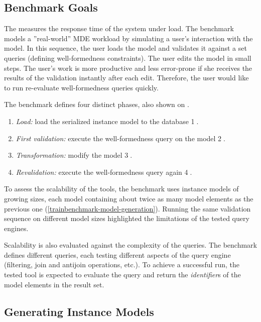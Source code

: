 \subsection{Benchmark Goals}

The \tb{} measures the response time of the system under load. The benchmark models a ''real-world'' MDE workload by simulating a user's interaction with the model. In this sequence, the user loads the model and validates it against a set  queries (defining well-formedness constraints). The user edits the model in small steps. The user's work is more productive and less error-prone if she receives the results of the validation instantly after each edit. Therefore, the user would like to run re-evaluate well-formedness queries quickly.


The benchmark defines four distinct phases, also shown on .

\begin{enumerate}
  \item \emph{Load:} load the serialized instance model to the database \textcircled{1}.
  \item \emph{First validation:} execute the well-formedness query on the model \textcircled{2}.
  \item \emph{Transformation:} modify the model \textcircled{3}.
  \item \emph{Revalidation:} execute the well-formedness query again \textcircled{4}.
\end{enumerate}

To assess the scalability of the tools, the benchmark uses instance models of growing sizes, each model containing about twice as many model elements as the previous one (\autoref{trainbenchmark-model-generation}). Running the same validation sequence on different model sizes highlighted the limitations of the tested query engines.

Scalability is also evaluated against the complexity of the queries. The benchmark defines different queries, each testing different aspects of the query engine (filtering, join and antijoin operations, etc.). To achieve a successful run, the tested tool is expected to evaluate the query and return the \emph{identifier}s of the model elements in the result set.

\subsection{Generating Instance Models}
\label{trainbenchmark-model-generation}


